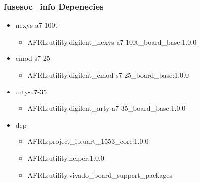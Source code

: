 \subsubsection{fusesoc\_info Depenecies}
\begin{itemize}
\item nexys-a7-100t
	\begin{itemize}
	\item AFRL:utility:digilent\_nexys-a7-100t\_board\_base:1.0.0
	\end{itemize}
\item cmod-s7-25
	\begin{itemize}
	\item AFRL:utility:digilent\_cmod-s7-25\_board\_base:1.0.0
	\end{itemize}
\item arty-a7-35
	\begin{itemize}
	\item AFRL:utility:digilent\_arty-a7-35\_board\_base:1.0.0
	\end{itemize}
\item dep
	\begin{itemize}
	\item AFRL:project\_ip:uart\_1553\_core:1.0.0
	\item AFRL:utility:helper:1.0.0
	\item AFRL:utility:vivado\_board\_support\_packages
	\end{itemize}
\end{itemize}
